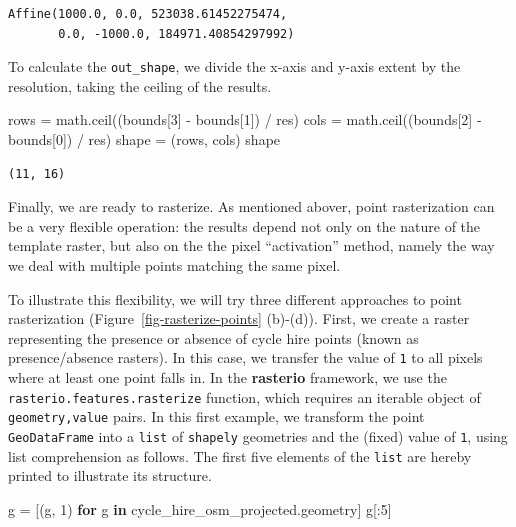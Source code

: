 \documentclass[
  letterpaper,
]{krantz}
\newenvironment{Shaded}{\begin{snugshade}}{\end{snugshade}}
\newcommand{\ControlFlowTok}[1]{\textcolor[rgb]{0.00,0.23,0.31}{\textbf{#1}}}
\newcommand{\DecValTok}[1]{\textcolor[rgb]{0.68,0.00,0.00}{#1}}
\newcommand{\KeywordTok}[1]{\textcolor[rgb]{0.00,0.23,0.31}{\textbf{#1}}}
\newcommand{\NormalTok}[1]{\textcolor[rgb]{0.00,0.23,0.31}{#1}}
\newcommand{\OperatorTok}[1]{\textcolor[rgb]{0.37,0.37,0.37}{#1}}
\begin{document}
\begin{verbatim}
Affine(1000.0, 0.0, 523038.61452275474,
       0.0, -1000.0, 184971.40854297992)
\end{verbatim}

To calculate the \texttt{out\_shape}, we divide the x-axis and y-axis
extent by the resolution, taking the ceiling of the results.

\begin{Shaded}
\begin{Highlighting}[]
\NormalTok{rows }\OperatorTok{=}\NormalTok{ math.ceil((bounds[}\DecValTok{3}\NormalTok{] }\OperatorTok{{-}}\NormalTok{ bounds[}\DecValTok{1}\NormalTok{]) }\OperatorTok{/}\NormalTok{ res)}
\NormalTok{cols }\OperatorTok{=}\NormalTok{ math.ceil((bounds[}\DecValTok{2}\NormalTok{] }\OperatorTok{{-}}\NormalTok{ bounds[}\DecValTok{0}\NormalTok{]) }\OperatorTok{/}\NormalTok{ res)}
\NormalTok{shape }\OperatorTok{=}\NormalTok{ (rows, cols)}
\NormalTok{shape}
\end{Highlighting}
\end{Shaded}

\begin{verbatim}
(11, 16)
\end{verbatim}

Finally, we are ready to rasterize. As mentioned abover, point
rasterization can be a very flexible operation: the results depend not
only on the nature of the template raster, but also on the the pixel
``activation'' method, namely the way we deal with multiple points
matching the same pixel.

To illustrate this flexibility, we will try three different approaches
to point rasterization (Figure~\ref{fig-rasterize-points} (b)-(d)).
First, we create a raster representing the presence or absence of cycle
hire points (known as presence/absence rasters). In this case, we
transfer the value of \texttt{1} to all pixels where at least one point
falls in. In the \textbf{rasterio} framework, we use the
\texttt{rasterio.features.rasterize} function, which requires an
iterable object of \texttt{geometry,value} pairs. In this first example,
we transform the point \texttt{GeoDataFrame} into a \texttt{list} of
\texttt{shapely} geometries and the (fixed) value of \texttt{1}, using
list comprehension as follows. The first five elements of the
\texttt{list} are hereby printed to illustrate its structure.

\begin{Shaded}
\begin{Highlighting}[]
\NormalTok{g }\OperatorTok{=}\NormalTok{ [(g, }\DecValTok{1}\NormalTok{) }\ControlFlowTok{for}\NormalTok{ g }\KeywordTok{in}\NormalTok{ cycle\_hire\_osm\_projected.geometry]}
\NormalTok{g[:}\DecValTok{5}\NormalTok{]}
\end{Highlighting}
\end{Shaded}
\end{document}
